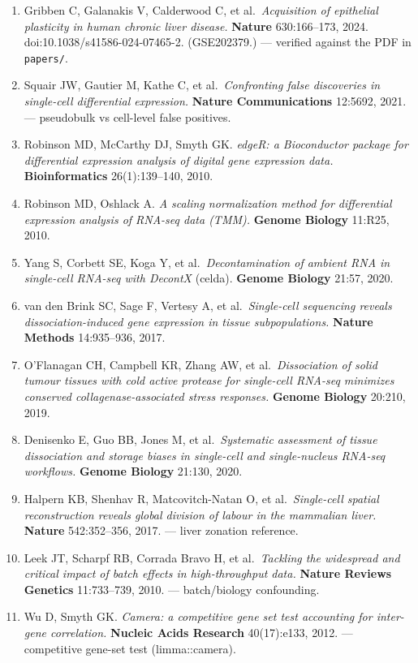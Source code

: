 \documentclass[11pt,a4paper]{article}
\begin{document}
\begin{enumerate}[leftmargin=1.6em]
  \item Gribben C, Galanakis V, Calderwood C, et al.\ \emph{Acquisition of epithelial plasticity in human chronic liver disease.} \textbf{Nature} 630:166--173, 2024. doi:10.1038/s41586-024-07465-2. (GSE202379.) --- verified against the PDF in \texttt{papers/}.
  \item Squair JW, Gautier M, Kathe C, et al.\ \emph{Confronting false discoveries in single-cell differential expression.} \textbf{Nature Communications} 12:5692, 2021. --- pseudobulk vs cell-level false positives.
  \item Robinson MD, McCarthy DJ, Smyth GK. \emph{edgeR: a Bioconductor package for differential expression analysis of digital gene expression data.} \textbf{Bioinformatics} 26(1):139--140, 2010.
  \item Robinson MD, Oshlack A. \emph{A scaling normalization method for differential expression analysis of RNA-seq data (TMM).} \textbf{Genome Biology} 11:R25, 2010.
  \item Yang S, Corbett SE, Koga Y, et al.\ \emph{Decontamination of ambient RNA in single-cell RNA-seq with DecontX} (celda). \textbf{Genome Biology} 21:57, 2020.
  \item van den Brink SC, Sage F, Vertesy A, et al.\ \emph{Single-cell sequencing reveals dissociation-induced gene expression in tissue subpopulations.} \textbf{Nature Methods} 14:935--936, 2017.
  \item O'Flanagan CH, Campbell KR, Zhang AW, et al.\ \emph{Dissociation of solid tumour tissues with cold active protease for single-cell RNA-seq minimizes conserved collagenase-associated stress responses.} \textbf{Genome Biology} 20:210, 2019.
  \item Denisenko E, Guo BB, Jones M, et al.\ \emph{Systematic assessment of tissue dissociation and storage biases in single-cell and single-nucleus RNA-seq workflows.} \textbf{Genome Biology} 21:130, 2020.
  \item Halpern KB, Shenhav R, Matcovitch-Natan O, et al.\ \emph{Single-cell spatial reconstruction reveals global division of labour in the mammalian liver.} \textbf{Nature} 542:352--356, 2017. --- liver zonation reference.
  \item Leek JT, Scharpf RB, Corrada Bravo H, et al.\ \emph{Tackling the widespread and critical impact of batch effects in high-throughput data.} \textbf{Nature Reviews Genetics} 11:733--739, 2010. --- batch/biology confounding.
  \item Wu D, Smyth GK. \emph{Camera: a competitive gene set test accounting for inter-gene correlation.} \textbf{Nucleic Acids Research} 40(17):e133, 2012. --- competitive gene-set test (limma::camera).

\end{enumerate}
\end{document}
